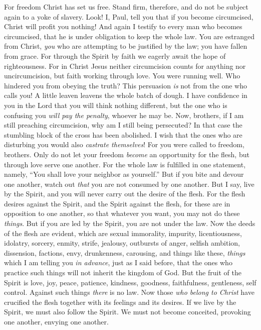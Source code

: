 \begin{biblechapter} %
 For freedom Christ has set us free. Stand firm, therefore, and do not be subject again to a yoke of slavery.
\verse Look! I, Paul, tell you that if you become circumcised, Christ will profit you nothing!
\verse And again I testify to every man who becomes circumcised, that he is under obligation to keep the whole law.
\verse You are estranged from Christ, \textit{you} who are attempting to be justified by the law; you have fallen from grace.
\verse For through the Spirit by faith we eagerly await the hope of righteousness.
\verse For in Christ Jesus neither circumcision counts for anything nor uncircumcision, but faith working through love.
\verse You were running well. Who hindered you from obeying the truth?
\verse This persuasion \textit{is} not from the one who calls you!
\verse A little leaven leavens the whole batch of dough.
\verse I have confidence in you in the Lord that you will think nothing different, but the one who is confusing you \textit{will pay the penalty}, whoever he may be.
\verse Now, brothers, if I am still preaching circumcision, why am I still being persecuted? In that case the stumbling block of the cross has been abolished.
\verse I wish that the ones who are disturbing you would also \textit{castrate themselves}!
\verse For you were called to freedom, brothers. Only do not let your freedom \textit{become} an opportunity for the flesh, but through love serve one another.
\verse For the whole law is fulfilled in one statement, namely, “You shall love your neighbor as yourself.”
\verse But if you bite and devour one another, watch out \textit{that} you are not consumed by one another.
 But I say, live by the Spirit, and you will never carry out the desire of the flesh.
\verse For the flesh desires against the Spirit, and the Spirit against the flesh, for these are in opposition to one another, so that whatever you want, you may not do these \textit{things}.
\verse But if you are led by the Spirit, you are not under the law.
\verse Now the deeds of the flesh are evident, which are sexual immorality, impurity, licentiousness,
\verse idolatry, sorcery, enmity, strife, jealousy, outbursts of anger, selfish ambition, dissension, factions,
\verse envy, drunkenness, carousing, and things like these, \textit{things} which I am telling you \textit{in advance}, just as I said before, that the ones who practice such things will not inherit the kingdom of God.
\verse But the fruit of the Spirit is love, joy, peace, patience, kindness, goodness, faithfulness,
\verse gentleness, self control. Against such things \textit{there} is no law.
\verse Now those \textit{who belong to Christ} have crucified the flesh together with its feelings and its desires.
\verse If we live by the Spirit, we must also follow the Spirit.
\verse We must not become conceited, provoking one another, envying one another.
\end{biblechapter}

